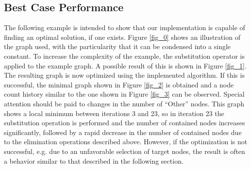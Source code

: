 \documentclass[
	accentcolor=1c,%
	type=intern,
	marginpar=false,
	ruledheaders=section,
	class=report,
	BCOR=5mm,
      parskip=half-,
	fontsize=10pt
	]{tudapub}
\begin{document}
		\subsection{Best Case Performance}
			The following example is intended to show that our implementation is capable of finding an optimal solution, if one exists.
			Figure \ref{fig_0} shows an illustration of the graph used, with the particularity that it can be condensed into a single constant.
			To increase the complexity of the example, the substitution operator is applied to the example graph. A possible result of this is shown in Figure \ref{fig_1}.
			The resulting graph is now optimized using the implemented algorithm.
			If this is successful, the minimal graph shown in Figure \ref{fig_2} is obtained and a node count history similar to the one shown in Figure \ref{fig_3} can be observed.
			Special attention should be paid to changes in the number of ``Other'' nodes. This graph shows a local minimum between iterations 3 and 23, so in iteration 23 the substitution operation is performed and the number of contained nodes increases significantly, followed by a rapid decrease in the number of contained nodes due to the elimination operations described above.
			However, if the optimization is not successful, e.g. due to an unfavorable selection of target nodes, the result is often a behavior similar to that described in the following section.
\end{document}

